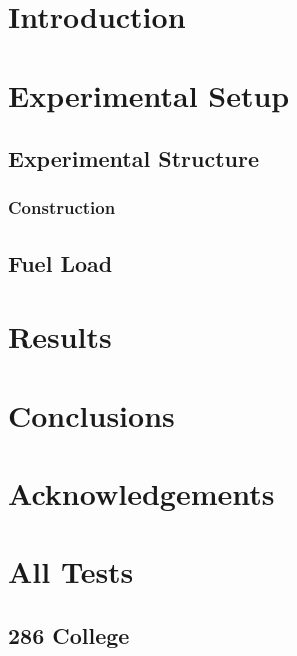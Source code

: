 \documentclass[12pt,oneside]{book}
\begin{document}
\mainmatter

\chapter{Introduction}
\label{chap:Introduction}

\chapter{Experimental Setup}
\label{chap:Experimental_Setup}

\section{Experimental Structure}
\label{sec:Experimental_Structure}

\subsection{Construction}
\label{sec:Construction}

\section{Fuel Load}

\chapter{Results}
\label{chap:Results}


\clearpage


\chapter{Conclusions}
\label{chap:Conclusions}

\chapter{Acknowledgements}
\label{chap:Acknowledgements}



\appendix

\chapter{All Tests}

\section{286 College}
\end{document}
